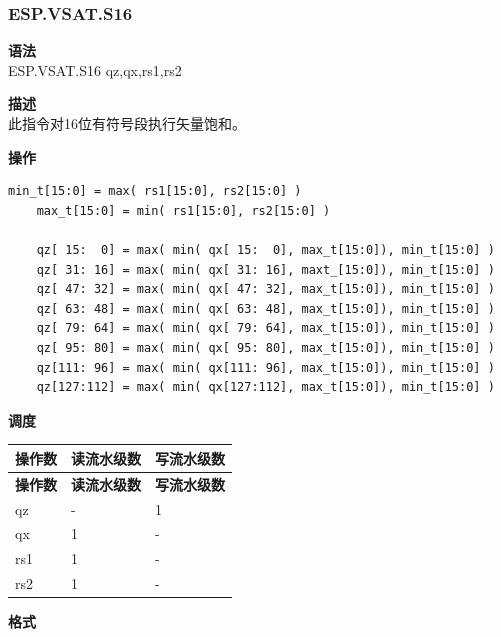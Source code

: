 \newpage

\newpage
\subsubsection{ESP.VSAT.S16}\label{instruction:ESPVSATS16}
\textbf{语法}\\
ESP.VSAT.S16 qz,qx,rs1,rs2

\textbf{描述}\\
此指令对16位有符号段执行矢量饱和。

\textbf{操作}\\
\begin{lstlisting}[escapeinside=`?]
    min_t[15:0] = max( rs1[15:0], rs2[15:0] )
    max_t[15:0] = min( rs1[15:0], rs2[15:0] )

    qz[ 15:  0] = max( min( qx[ 15:  0], max_t[15:0]), min_t[15:0] )
    qz[ 31: 16] = max( min( qx[ 31: 16], maxt_[15:0]), min_t[15:0] )
    qz[ 47: 32] = max( min( qx[ 47: 32], max_t[15:0]), min_t[15:0] )
    qz[ 63: 48] = max( min( qx[ 63: 48], max_t[15:0]), min_t[15:0] )
    qz[ 79: 64] = max( min( qx[ 79: 64], max_t[15:0]), min_t[15:0] )
    qz[ 95: 80] = max( min( qx[ 95: 80], max_t[15:0]), min_t[15:0] )
    qz[111: 96] = max( min( qx[111: 96], max_t[15:0]), min_t[15:0] )
    qz[127:112] = max( min( qx[127:112], max_t[15:0]), min_t[15:0] )
\end{lstlisting}


\textbf{调度}\\
\begin{longtable}[c]{|l|l|l|}
    \hline
    \rowcolor{lightgray}
    \textbf{操作数} & \textbf{读流水级数} & \textbf{写流水级数} \\\hline
    \endfirsthead
    \hline
    \rowcolor{lightgray}
     \textbf{操作数} & \textbf{读流水级数} & \textbf{写流水级数} \\\hline
    \endhead
    \hline
    \endfoot

  qz & - & 1 \\\hline
    qx & 1 & - \\\hline
    rs1 & 1 & - \\\hline
    rs2 & 1 & -

\end{longtable}

\textbf{格式}\\


